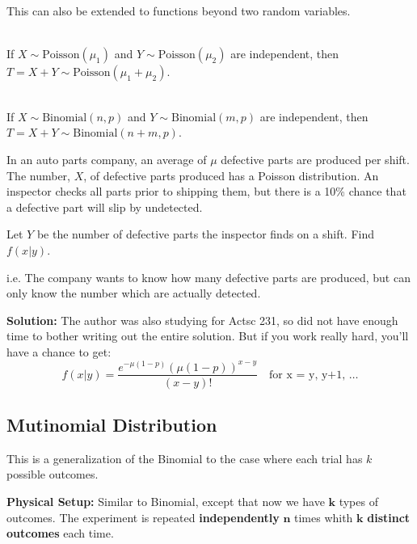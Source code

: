 This can also be extended to functions beyond two random variables. \\

\begin{theorem}
    \phantom{}\\
    If $X \sim \text{Poisson}(\mu_1)$ and $Y \sim \text{Poisson}(\mu_2)$ are independent, then 
    $T = X + Y \sim \text{Poisson}(\mu_1 + \mu_2)$.
\end{theorem}


\begin{theorem}
    \phantom{}\\
    If $X \sim \text{Binomial}(n, p)$ and $Y \sim \text{Binomial}(m, p)$ are independent, then \\
    $T = X + Y \sim \text{Binomial}(n + m, p)$.
\end{theorem}
\phantom{}

\begin{example}
    In an auto parts company, an average of $\mu$ defective parts are produced per shift. The number, $X$, of defective parts produced has a Poisson distribution.
    An inspector checks all parts prior to shipping them, but there is a 10\% chance that a defective part will slip by undetected.

    Let $Y$ be the number of defective parts the inspector finds on a shift. Find $f(x|y)$.

    i.e. The company wants to know how many defective parts are produced, but can only know the number which are actually detected.

    \textbf{Solution:} The author was also studying for Actsc 231, so did not have enough time to bother writing out the entire solution. But if you work really hard, you'll have a chance to get:
    \[
        f(x|y) = \frac{e^{-\mu (1-p)} (\mu (1-p))^{x-y}}{(x-y)!} \quad \text{for x = y, y+1, \ldots}
    \]
\end{example}

\pagebreak

\subsection{Mutinomial Distribution}

This is a generalization of the Binomial to the case where each trial has $k$ possible outcomes.

\textbf{Physical Setup:} Similar to Binomial, except that now we have $\mathbf{k}$ types of outcomes. The experiment is repeated \textbf{independently} $\mathbf{n}$ times whith $\mathbf{k}$ \textbf{distinct outcomes} each time.


